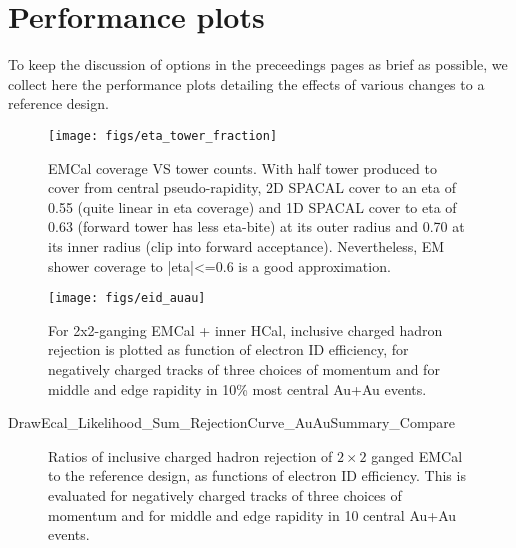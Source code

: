 
\chapter*{Performance plots}
\label{cha:performance-plots}

To keep the discussion of options in the preceedings pages as brief as
possible, we collect here the performance plots detailing the effects
of various changes to a reference design.

\begin{figure}[hbt]
  \centering
  \texttt{[image: figs/eta\_tower\_fraction]}
  \caption{EMCal coverage VS tower counts. With half tower produced to cover from central pseudo-rapidity, 2D SPACAL cover to an eta of 0.55 (quite linear in eta coverage) and 1D SPACAL cover to eta of 0.63 (forward tower has less eta-bite) at its outer radius and 0.70 at its inner radius (clip into forward acceptance). Nevertheless, EM shower coverage to |eta|<=0.6 is a good approximation.}
  \label{fig:eta_tower_fraction}
\end{figure}

\begin{figure}[hbt]
  \centering
  \texttt{[image: figs/eid\_auau]}
  \caption{For 2x2-ganging EMCal + inner HCal, inclusive charged
    hadron rejection is plotted as function of electron ID efficiency,
    for negatively charged tracks of three choices of momentum and for
    middle and edge rapidity in 10\% most central Au+Au events.}
  \label{fig:eid_auau}
\end{figure}

DrawEcal_Likelihood_Sum_RejectionCurve_AuAuSummary_Compare
\begin{figure}[hbt]
  \centering

  \caption{ Ratios of inclusive charged hadron rejection of $2\times2$ ganged
 EMCal to the reference design, as functions of electron ID
 efficiency. This is evaluated for negatively charged tracks of three
 choices of momentum and for middle and edge rapidity in 10%
 central Au+Au events.}
\label{fig:eid_ratios_auau}
\end{figure}